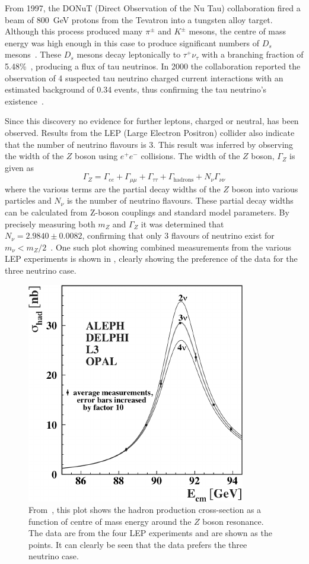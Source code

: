 From 1997, the DONuT (Direct Observation of the Nu Tau) collaboration fired a beam of 800~GeV protons from the Tevatron into a tungsten alloy target.
Although this process produced many $\pi^{\pm}$ and $K^{\pm}$ mesons, the centre of mass energy was high enough in this case to produce significant numbers of $D_{s}$ mesons~\cite{donutFinal}.
These $D_{s}$ mesons decay leptonically to $\tau^{+}\nu_{\tau}$ with a branching fraction of 5.48\%~\cite{dsFraction}, producing a flux of tau neutrinos.
In 2000 the collaboration reported the observation of 4 suspected tau neutrino charged current interactions with an estimated background of 0.34 events, thus confirming the tau neutrino's existence~\cite{tauNeutrino}.  

Since this discovery no evidence for further leptons, charged or neutral, has been observed.
Results from the LEP (Large Electron Positron) collider also indicate that the number of neutrino flavours is 3.
This result was inferred by observing the width of the $Z$ boson using $e^{+}e^{-}$ collisions.
The width of the $Z$ boson, $\Gamma_{Z}$ is given as
\begin{equation}
  \Gamma_{Z} = \Gamma_{ee} + \Gamma_{\mu\mu} + \Gamma_{\tau\tau} + \Gamma_{\text{hadrons}} + N_{\nu}\Gamma_{\nu\nu}
\end{equation}
where the various terms are the partial decay widths of the $Z$ boson into various particles and $N_{\nu}$ is the number of neutrino flavours.
These partial decay widths can be calculated from Z-boson couplings and standard model parameters.
By precisely measuring both $m_{Z}$ and $\Gamma_{Z}$ it was determined that $N_{\nu} = 2.9840 \pm 0.0082$, confirming that only 3 flavours of neutrino exist for $m_{\nu} < m_{Z}/2$~\cite{zBosonWidth}.
One such plot showing combined measurements from the various LEP experiments is shown in , clearly showing the preference of the data for the three neutrino case.

\begin{figure}[h]
  \centering
  \includegraphics[width=.5\linewidth]{files/figures/theory/zBosonWidth}
  \caption[Hadron production cross-section around $Z$ boson resonance.]{From~\cite{zBosonWidth}, this plot shows the hadron production cross-section as a function of centre of mass energy around the $Z$ boson resonance. The data are from the four LEP experiments and are shown as the points. It can clearly be seen that the data prefers the three neutrino case.}
  \label{fig:zBosonWidth}
\end{figure}

